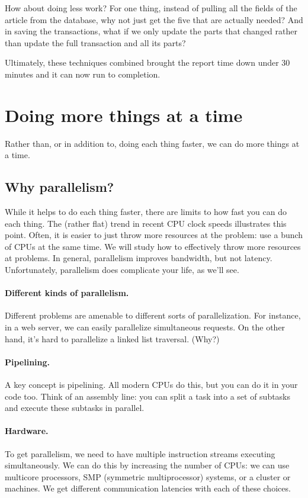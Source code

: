 \documentclass[a4paper]{report}
\begin{document}
How about doing less work? For one thing, instead of pulling all the fields of the article from the database, why not just get the five that are actually needed? And in saving the transactions, what if we only update the parts that changed rather than update the full transaction and all its parts?

Ultimately, these techniques combined brought the report time down under 30 minutes and it can now run to completion. 

\section*{Doing more things at a time} 
Rather than, or in addition to, doing each thing faster, we can do
more things at a time.

\subsection*{Why parallelism?}
While it helps to do each thing faster, there are limits to how fast
you can do each thing. The (rather flat) trend in recent CPU clock
speeds illustrates this point.  Often, it is easier to just throw more
resources at the problem: use a bunch of CPUs at the same time. We
will study how to effectively throw more resources at problems.
In general, parallelism improves bandwidth, but not latency.
Unfortunately, parallelism does complicate your life, as we'll see.

\paragraph{Different kinds of parallelism.} Different problems are amenable
to different sorts of parallelization. For instance, in a web server, we
can easily parallelize simultaneous requests. On the other hand, it's hard
to parallelize a linked list traversal. (Why?)

\paragraph{Pipelining.} A key concept is pipelining. All modern CPUs do this,
but you can do it in your code too. Think of an assembly line: you can split
a task into a set of subtasks and execute these subtasks in parallel.

\paragraph{Hardware.} To get parallelism, we need to have multiple instruction
streams executing simultaneously. We can do this by increasing the
number of CPUs: we can use multicore processors, SMP (symmetric
multiprocessor) systems, or a cluster or machines. We get different
communication latencies with each of these choices.
\end{document}
